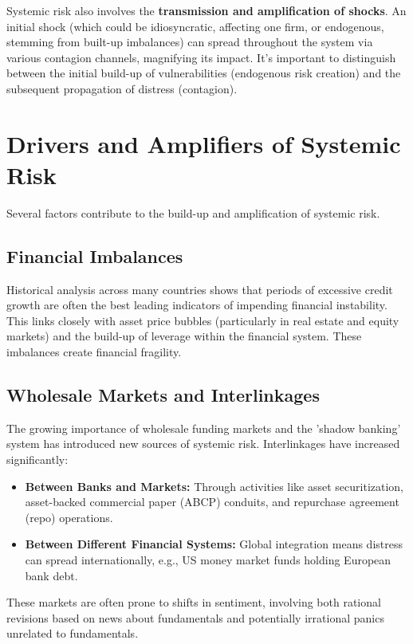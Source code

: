 Systemic risk also involves the \textbf{transmission and amplification of shocks}. An initial shock (which could be idiosyncratic, affecting one firm, or endogenous, stemming from built-up imbalances) can spread throughout the system via various contagion channels, magnifying its impact. It's important to distinguish between the initial build-up of vulnerabilities (endogenous risk creation) and the subsequent propagation of distress (contagion).

\section{Drivers and Amplifiers of Systemic Risk}

Several factors contribute to the build-up and amplification of systemic risk.

\subsection{Financial Imbalances}
Historical analysis across many countries shows that periods of excessive credit growth are often the best leading indicators of impending financial instability. This links closely with asset price bubbles (particularly in real estate and equity markets) and the build-up of leverage within the financial system. These imbalances create financial fragility.

\subsection{Wholesale Markets and Interlinkages}
The growing importance of wholesale funding markets and the 'shadow banking' system has introduced new sources of systemic risk. Interlinkages have increased significantly:
\begin{itemize}
    \item \textbf{Between Banks and Markets:} Through activities like asset securitization, asset-backed commercial paper (ABCP) conduits, and repurchase agreement (repo) operations.
    \item \textbf{Between Different Financial Systems:} Global integration means distress can spread internationally, e.g., US money market funds holding European bank debt.
\end{itemize}
These markets are often prone to shifts in sentiment, involving both rational revisions based on news about fundamentals and potentially irrational panics unrelated to fundamentals.


